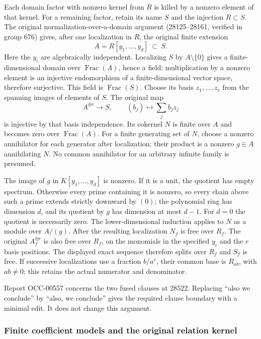 Each domain factor with nonzero kernel from \(R\) is killed by a nonzero element of that kernel. For a remaining factor, retain its name \(S\) and the injection \(R\subset S\). The original normalization-over-a-domain argument (28125--28161, verified in group 676) gives, after one localization in \(R\), the original finite extension \[
 A=R[y_1,\ldots,y_d]\ \subset\ S.
\] Here the \(y_i\) are algebraically independent. Localizing \(S\) by \(A\setminus\{0\}\) gives a finite-dimensional domain over \(\operatorname{Frac}(A)\), hence a field: multiplication by a nonzero element is an injective endomorphism of a finite-dimensional vector space, therefore surjective. This field is \(\operatorname{Frac}(S)\). Choose its basis \(z_1,\ldots,z_r\) from the spanning images of elements of \(S\). The original map \[
 A^{\oplus r}\longrightarrow S,\qquad (b_j)\longmapsto\sum_j b_jz_j
\] is injective by that basis independence. Its cokernel \(N\) is finite over \(A\) and becomes zero over \(\operatorname{Frac}(A)\). For a finite generating set of \(N\), choose a nonzero annihilator for each generator after localization; their product is a nonzero \(g\in A\) annihilating \(N\). No common annihilator for an arbitrary infinite family is presumed.

The image of \(g\) in \(K[y_1,\ldots,y_d]\) is nonzero. If it is a unit, the quotient has empty spectrum. Otherwise every prime containing it is nonzero, so every chain above such a prime extends strictly downward by \((0)\); the polynomial ring has dimension \(d\), and its quotient by \(g\) has dimension at most \(d-1\). For \(d=0\) the quotient is necessarily zero. The lower-dimensional induction applies to \(N\) as a module over \(A/(g)\). After the resulting localization \(N_f\) is free over \(R_f\). The original \(A_f^{\oplus r}\) is also free over \(R_f\), on the monomials in the specified \(y_i\) and the \(r\) basis positions. The displayed exact sequence therefore splits over \(R_f\) and \(S_f\) is free. If successive localizations use a fraction \(b/a^v\), their common base is \(R_{ab}\), with \(ab\ne0\); this retains the actual numerator and denominator.

Report OCC-00557 concerns the two fused clauses at 28522. Replacing ``also we conclude'' by ``also, we conclude'' gives the required clause boundary with a minimal edit. It does not change this argument.

\subsubsection{Finite coefficient models and the original relation kernel}\label{finite-coefficient-models-and-the-original-relation-kernel}

